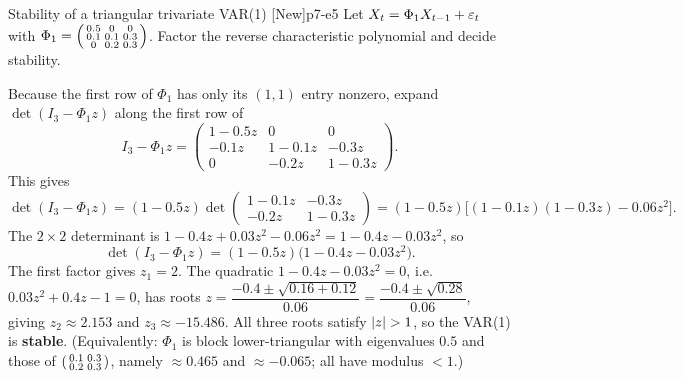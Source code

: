 \begin{exercise}{Stability of a triangular trivariate VAR(1) \quad\textnormal{[New]}}{p7-e5}
Let $X_t=\Phi_1 X_{t-1}+\varepsilon_t$ with
$\Phi_1=\begin{psmallmatrix}0.5&0&0\\0.1&0.1&0.3\\0&0.2&0.3\end{psmallmatrix}$.
Factor the reverse characteristic polynomial and decide stability.
\end{exercise}
\begin{solution}
Because the first row of $\Phi_1$ has only its $(1,1)$ entry nonzero, expand
$\det(I_3-\Phi_1 z)$ along the first row of
\[
I_3-\Phi_1 z=\begin{pmatrix}1-0.5z & 0 & 0\\ -0.1z & 1-0.1z & -0.3z\\ 0 & -0.2z & 1-0.3z\end{pmatrix}.
\]
This gives
\[
\det(I_3-\Phi_1 z)=(1-0.5z)\det\begin{pmatrix}1-0.1z & -0.3z\\ -0.2z & 1-0.3z\end{pmatrix}
=(1-0.5z)\big[(1-0.1z)(1-0.3z)-0.06z^2\big].
\]
The $2\times2$ determinant is $1-0.4z+0.03z^2-0.06z^2=1-0.4z-0.03z^2$, so
\[
\det(I_3-\Phi_1 z)=(1-0.5z)\big(1-0.4z-0.03z^2\big).
\]
The first factor gives $z_1=2$. The quadratic $1-0.4z-0.03z^2=0$, i.e.\
$0.03z^2+0.4z-1=0$, has roots
$z=\dfrac{-0.4\pm\sqrt{0.16+0.12}}{0.06}=\dfrac{-0.4\pm\sqrt{0.28}}{0.06}$,
giving $z_2\approx2.153$ and $z_3\approx-15.486$. All three roots satisfy
$\left\lvert z \right\rvert>1$, so the VAR(1) is \textbf{stable}. (Equivalently: $\Phi_1$ is block
lower-triangular with eigenvalues $0.5$ and those of
$\begin{psmallmatrix}0.1&0.3\\0.2&0.3\end{psmallmatrix}$, namely
$\approx0.465$ and $\approx-0.065$; all have modulus $<1$.)
\end{solution}

